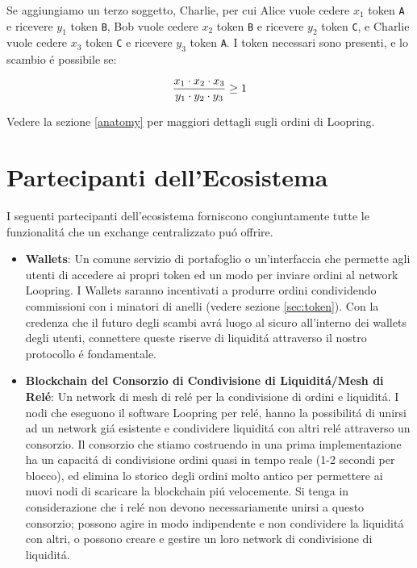 \documentclass[UTF8,nofonts]{article}
\begin{document}
\begin{multicols}{2}
Se aggiungiamo un terzo soggetto, Charlie, per cui Alice vuole cedere $x_1$ token \verb|A| e ricevere $y_1$ token \verb|B|, Bob vuole cedere $x_2$ token \verb|B| e ricevere $y_2$ token \verb|C|, e Charlie vuole cedere $x_3$ token \verb|C| e ricevere $y_3$ token \verb|A|.  I token necessari sono presenti, e lo scambio \'e possibile se:

\begin{equation}
{{x_1 \cdot x_2 \cdot x_3 \over y_1 \cdot y_2 \cdot y_3} \geq 1}
\end{equation}


Vedere la sezione \ref{anatomy} per maggiori dettagli sugli ordini di Loopring.



\section{Partecipanti dell'Ecosistema\label{sec:ecosystem}}
I seguenti partecipanti dell'ecosistema forniscono congiuntamente tutte le funzionalit\'a che un exchange centralizzato pu\'o offrire.

\begin{itemize}

\item \textbf{Wallets}: Un comune servizio di portafoglio o un'interfaccia che permette agli utenti di accedere ai propri token ed un modo per inviare ordini al network Loopring. I Wallets saranno incentivati a produrre ordini condividendo commissioni con i minatori di anelli  (vedere sezione \ref{sec:token}). Con la credenza che il futuro degli scambi avr\'a luogo al sicuro all'interno dei wallets degli utenti, connettere queste riserve di liquidit\'a attraverso il nostro protocollo \'e fondamentale.

\item \textbf{Blockchain del Consorzio di Condivisione di Liquidit\'a/Mesh di Rel\'e}: Un network di mesh di rel\'e per la condivisione di ordini e liquidit\'a.  I nodi che eseguono il software Loopring per rel\'e, hanno la possibilit\'a di unirsi ad un network gi\'a esistente e condividere liquidit\'a con altri rel\'e attraverso un consorzio. Il consorzio che stiamo costruendo in una prima implementazione ha un capacit\'a di condivisione ordini quasi in tempo reale (1-2 secondi per blocco), ed elimina lo storico degli ordini molto antico per permettere ai nuovi nodi di scaricare la blockchain pi\'u velocemente.
Si tenga in considerazione che i rel\'e non devono necessariamente unirsi a questo consorzio; possono agire in modo indipendente e non condividere la liquidit\'a con altri, o possono creare e gestire un loro network di condivisione di liquidit\'a.


\end{itemize}
\end{multicols}
\end{document}
